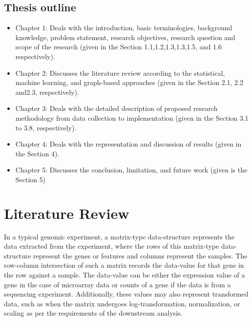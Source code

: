 \documentclass[
]{article}
\providecommand{\tightlist}{%
  \setlength{\itemsep}{0pt}\setlength{\parskip}{0pt}}
\begin{document}
\hypertarget{thesis-outline}{%
\subsection{Thesis outline}\label{thesis-outline}}

\begin{itemize}
\tightlist
\item
  Chapter 1: Deals with the introduction, basic terminologies,
  background knowledge, problem statement, research objectives, research
  question and scope of the research (given in the Section
  1.1,1.2,1.3,1.3,1.5, and 1.6 respectively).
\item
  Chapter 2: Discusses the literature review according to the
  statistical, machine learning, and graph-based approaches (given in
  the Section 2.1, 2.2 and2.3, respectively).
\item
  Chapter 3: Deals with the detailed description of proposed research
  methodology from data collection to implementation (given in the
  Section 3.1 to 3.8, respectively).
\item
  Chapter 4: Deals with the representation and discussion of results
  (given in the Section 4).
\item
  Chapter 5: Discusses the conclusion, limitation, and future work
  (given is the Section 5)
\end{itemize}

\hypertarget{literature-review}{%
\section{Literature Review}\label{literature-review}}

In a typical genomic experiment, a matrix-type data-structure represents
the data extracted from the experiment, where the rows of this
matrix-type data-structure represent the genes or features and columns
represent the samples. The row-column intersection of such a matrix
records the data-value for that gene in the row against a sample. The
data-value can be either the expression value of a gene in the case of
microarray data or counts of a gene if the data is from a sequencing
experiment. Additionally, these values may also represent transformed
data, such as when the matrix undergoes log-transformation,
normalization, or scaling as per the requirements of the downstream
analysis.
\end{document}
